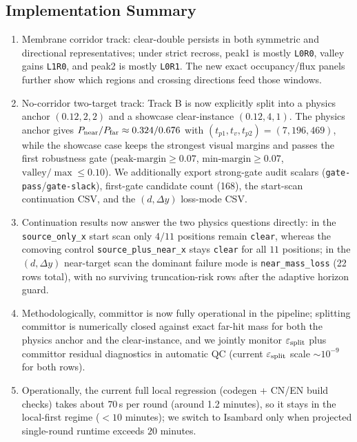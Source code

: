 \documentclass[11pt]{article}
\begin{document}
\subsection*{Implementation Summary}
\begin{enumerate}
  \item Membrane corridor track: clear-double persists in both symmetric and directional representatives; under strict recross, peak1 is mostly \texttt{L0R0}, valley gains \texttt{L1R0}, and peak2 is mostly \texttt{L0R1}. The new exact occupancy/flux panels further show which regions and crossing directions feed those windows.
  \item No-corridor two-target track: Track B is now explicitly split into a physics anchor $(0.12,2,2)$ and a showcase clear-instance $(0.12,4,1)$. The physics anchor gives $P_{\rm near}/P_{\rm far}\approx0.324/0.676$ with $(t_{p1},t_v,t_{p2})=(7,196,469)$, while the showcase case keeps the strongest visual margins and passes the first robustness gate ($\mathrm{peak\mbox{-}margin}\ge 0.07$, $\mathrm{min\mbox{-}margin}\ge 0.07$, $\mathrm{valley}/\max\le 0.10$). We additionally export strong-gate audit scalars (\texttt{gate-pass}/\texttt{gate-slack}), first-gate candidate count (168), the start-scan continuation CSV, and the $(d,\Delta y)$ loss-mode CSV.
  \item Continuation results now answer the two physics questions directly: in the \texttt{source\_only\_x} start scan only $4/11$ positions remain \texttt{clear}, whereas the comoving control \texttt{source\_plus\_near\_x} stays \texttt{clear} for all $11$ positions; in the $(d,\Delta y)$ near-target scan the dominant failure mode is \texttt{near\_mass\_loss} (22 rows total), with no surviving truncation-risk rows after the adaptive horizon guard.
  \item Methodologically, committor is now fully operational in the pipeline; splitting committor is numerically closed against exact far-hit mass for both the physics anchor and the clear-instance, and we jointly monitor $\varepsilon_{\rm split}$ plus committor residual diagnostics in automatic QC (current $\varepsilon_{\rm split}$ scale $\sim10^{-9}$ for both rows).
  \item Operationally, the current full local regression (codegen + CN/EN build checks) takes about $70\,$s per round (around 1.2 minutes), so it stays in the local-first regime ($<10$ minutes); we switch to Isambard only when projected single-round runtime exceeds $20$ minutes.
\end{enumerate}
\end{document}
